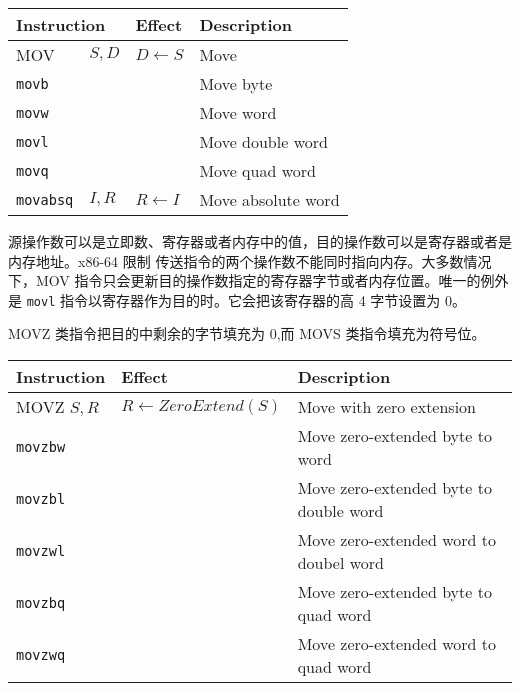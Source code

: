 \begin{table}[!ht]
    \centering
    \begin{tabular}{llll}
        \toprule
        \multicolumn{2}{l}{Instruction} & Effect & Description \\
        \midrule
        MOV                & $S, D$ & $D \leftarrow S$  & Move \\
        \quad\texttt{movb} &        &                   & Move byte \\
        \quad\texttt{movw} &        &                   & Move word \\
        \quad\texttt{movl} &        &                   & Move double word \\
        \quad\texttt{movq} &        &                   & Move quad word \\
        \texttt{movabsq}   & $I, R$ & $R \leftarrow I$  & Move absolute word \\
        \bottomrule
    \end{tabular}
\end{table}


源操作数可以是立即数、寄存器或者内存中的值，目的操作数可以是寄存器或者是内存地址。x86-64 限制 传送指令的两个操作数不能同时指向内存。大多数情况下，MOV 指令只会更新目的操作数指定的寄存器字节或者内存位置。唯一的例外是 \verb|movl| 指令以寄存器作为目的时。它会把该寄存器的高 4 字节设置为 0。

MOVZ 类指令把目的中剩余的字节填充为 0,而 MOVS 类指令填充为符号位。

\begin{table}[!ht]
    \centering
    \begin{tabular}{lll}
        \toprule
        Instruction & Effect & Description \\
        \midrule
        MOVZ \quad $S, R$ & $R \leftarrow ZeroExtend(S)$ & Move with zero extension \\
        \quad\texttt{movzbw} & & Move zero-extended byte to word \\
        \quad\texttt{movzbl} & & Move zero-extended byte to double word \\
        \quad\texttt{movzwl} & & Move zero-extended word to doubel word \\
        \quad\texttt{movzbq} & & Move zero-extended byte to quad word \\
        \quad\texttt{movzwq} & & Move zero-extended word to quad word \\
        \bottomrule
    \end{tabular}
\end{table}

